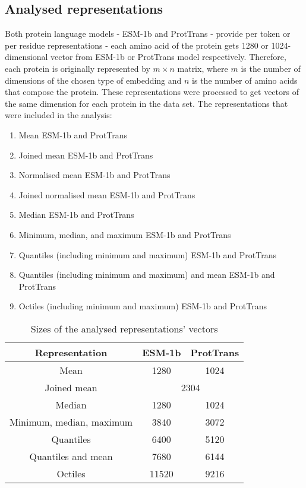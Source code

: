 \documentclass[12pt]{article}
\begin{document}
	\subsection{Analysed representations}
	
	Both protein language models - ESM-1b and ProtTrans - provide 
	per token or per residue representations - each 
	amino acid of the protein gets 1280 or 1024-dimensional vector from
	ESM-1b or ProtTrans model respectively. Therefore, each protein is 
	originally represented by ${m \times n}$ matrix, 
	where ${m}$ is the number of dimensions of the chosen type of embedding
	and ${n}$ is the number of amino acids that compose the protein. 
	These representations were processed to get vectors of the same dimension 
	for each protein in the data set. The representations 
	that were included in the analysis:

	\begin{enumerate}
		\item Mean ESM-1b and ProtTrans 
		\item Joined mean ESM-1b and ProtTrans
		\item Normalised mean ESM-1b and ProtTrans
		\item Joined normalised mean ESM-1b and ProtTrans
		\item Median ESM-1b and ProtTrans
		\item Minimum, median, and maximum ESM-1b and ProtTrans
		\item Quantiles (including minimum and maximum) ESM-1b and ProtTrans
		\item Quantiles (including minimum and maximum) and mean ESM-1b and ProtTrans
		\item Octiles (including minimum and maximum) ESM-1b and ProtTrans
	\end{enumerate}

	\begin{table}[h!]
		\caption{Sizes of the analysed representations' vectors}
		\vspace{0.2cm}
		\centering
		\begin{tabular}{ | c | c c | }
			\hline 
			Representation & ESM-1b & ProtTrans \\
			\hline 
			Mean & 1280 & 1024 \\
			Joined mean & \multicolumn{2}{c|}{2304} \\
			Median & 1280 & 1024 \\
			Minimum, median, maximum & 3840 & 3072 \\
			Quantiles & 6400 & 5120 \\
			Quantiles and mean & 7680 & 6144 \\
			Octiles & 11520 & 9216 \\
			\hline    
		\end{tabular}
		\label{table:vectorsDimensions}
	\end{table}
\end{document}
